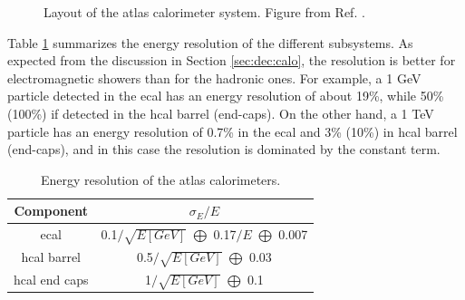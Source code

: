 \begin{figure}[ht]
\centering
{}
\caption{Layout of the \gls{atlas} calorimeter system. Figure from Ref. \cite{atlas:atlas}.}
\label{fig:atlas:calo}
\end{figure}

Table \ref{tab:atlas:cal:reso} summarizes the energy resolution of the different subsystems. As expected from the discussion in Section \ref{sec:dec:calo}, the resolution is better for electromagnetic showers than for the hadronic ones. For example, a 1 GeV particle detected in the \gls{ecal} has an energy resolution of about 19\%, while 50\% (100\%) if detected in the \gls{hcal} barrel (end-caps). On the other hand, a 1 TeV particle has an energy resolution of 0.7\% in the \gls{ecal} and 3\% (10\%) in  \gls{hcal} barrel (end-caps), and in this case the resolution is dominated by the constant term.

\begin{table}[ht]
\begin{center}
\begin{tabular}{c c }
\hline
Component & $\sigma_E / E$ \\
\hline 
\hline
\gls{ecal} & 0.1$/\sqrt{E[GeV]}$ $\bigoplus$ 0.17$/E$ $\bigoplus$ 0.007 \\ %
\hline
\gls{hcal} barrel & 0.5$/\sqrt{E[GeV]}$ $\bigoplus$ 0.03 \\
\hline
\gls{hcal} end caps & 1$/\sqrt{E[GeV]}$ $\bigoplus$ 0.1 \\
\hline
\end{tabular}
\end{center}
\caption{Energy resolution of the \gls{atlas} calorimeters.}
\label{tab:atlas:cal:reso}
\end{table}

